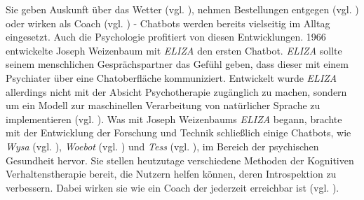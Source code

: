


Sie geben Auskunft über das Wetter (vgl. \cite{GoogleAl38:online}), nehmen Bestellungen entgegen (vgl. \cite{KassenSc50:online}) oder wirken als Coach (vgl. \cite{Wysayour57:online}) - Chatbots werden bereits vielseitig im Alltag eingesetzt. Auch die Psychologie profitiert von diesen Entwicklungen. 1966 entwickelte Joseph Weizenbaum mit \emph{ELIZA} den ersten Chatbot. \emph{ELIZA} sollte seinem menschlichen Gesprächspartner das Gefühl geben, dass dieser mit einem Psychiater über eine Chatoberfläche kommuniziert. Entwickelt wurde \emph{ELIZA} allerdings nicht mit der Absicht  Psychotherapie zugänglich zu machen, sondern um ein Modell zur maschinellen Verarbeitung von natürlicher Sprache zu implementieren (vgl. \cite{Weizenbaum1966}). Was mit Joseph Weizenbaums \emph{ELIZA} begann, brachte mit der Entwicklung der Forschung und Technik schließlich einige Chatbots, wie \emph{Wysa} (vgl. \cite{Wysayour57:online}), \emph{Woebot} (vgl. \cite{WoebotYo93:online}) und \emph{Tess} (vgl. \cite{TessArti99:online}), im Bereich der psychischen Gesundheit hervor. Sie stellen heutzutage verschiedene Methoden der Kognitiven Verhaltenstherapie bereit, die Nutzern helfen können, deren Introspektion zu verbessern. Dabei wirken sie wie ein Coach der jederzeit erreichbar ist (vgl. \cite{Fitzpatrick2017}).  

